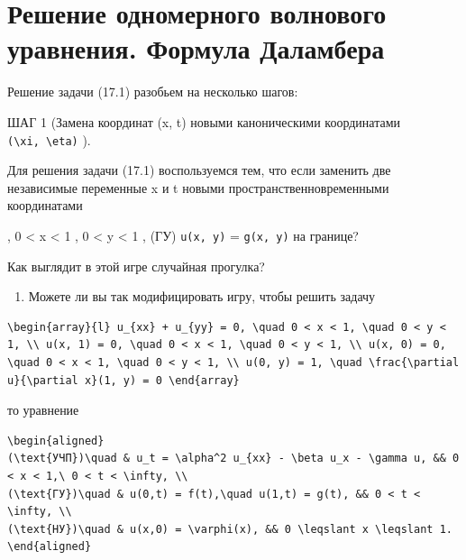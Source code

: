 \documentclass[
  ukrainian,
]{article}
\providecommand{\tightlist}{%
  \setlength{\itemsep}{0pt}\setlength{\parskip}{0pt}}
\begin{document}
\section{Решение одномерного волнового уравнения. Формула
Даламбера}\label{ux440ux435ux448ux435ux43dux438ux435-ux43eux434ux43dux43eux43cux435ux440ux43dux43eux433ux43e-ux432ux43eux43bux43dux43eux432ux43eux433ux43e-ux443ux440ux430ux432ux43dux435ux43dux438ux44f.-ux444ux43eux440ux43cux443ux43bux430-ux434ux430ux43bux430ux43cux431ux435ux440ux430}

Решение задачи (17.1) разобьем на несколько шагов:

ШАГ 1 (Замена координат (x, t) новыми каноническими координатами
\texttt{(\textbackslash{}xi,\ \textbackslash{}eta)} ).

Для решения задачи (17.1) воспользуемся тем, что если заменить две
независимые переменные x и t новыми пространственновременными
координатами

, 0 \textless{} x \textless{} 1 , 0 \textless{} y \textless{} 1 , (ГУ)
\texttt{u(x,\ y)} = \texttt{g(x,\ y)} на границе?

Как выглядит в этой игре случайная прогулка?

\begin{enumerate}
\def\labelenumi{\arabic{enumi}.}
\setcounter{enumi}{3}
\tightlist
\item
  Можете ли вы так модифицировать игру, чтобы решить задачу
\end{enumerate}

\begin{verbatim}
\begin{array}{l} u_{xx} + u_{yy} = 0, \quad 0 < x < 1, \quad 0 < y < 1, \\ u(x, 1) = 0, \quad 0 < x < 1, \quad 0 < y < 1, \\ u(x, 0) = 0, \quad 0 < x < 1, \quad 0 < y < 1, \\ u(0, y) = 1, \quad \frac{\partial u}{\partial x}(1, y) = 0 \end{array}
\end{verbatim}

то уравнение

\begin{verbatim}
\begin{aligned}
(\text{УЧП})\quad & u_t = \alpha^2 u_{xx} - \beta u_x - \gamma u, && 0 < x < 1,\ 0 < t < \infty, \\
(\text{ГУ})\quad & u(0,t) = f(t),\quad u(1,t) = g(t), && 0 < t < \infty, \\
(\text{НУ})\quad & u(x,0) = \varphi(x), && 0 \leqslant x \leqslant 1.
\end{aligned}
\end{verbatim}
\end{document}
